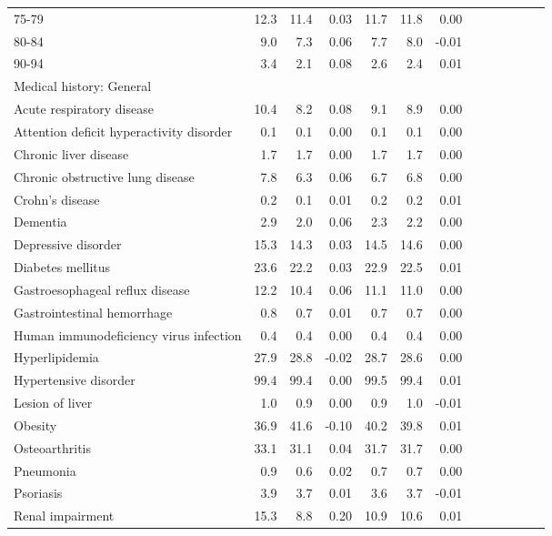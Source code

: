 \documentclass[11pt,]{article}
\begin{document}
\begin{longtable}{lrrrrrrrrrrrr}
      75-79 & 12.3 & 11.4 &  0.03 &  11.7 & 11.8 &  0.00 \\ 
      80-84 &  9.0 &  7.3 &  0.06 &   7.7 &  8.0 & -0.01 \\ 
      90-94 &  3.4 &  2.1 &  0.08 &   2.6 &  2.4 &  0.01 \\ 
  Medical history: General &    &    &     &     &    &     \\ 
      Acute respiratory disease & 10.4 &  8.2 &  0.08 &   9.1 &  8.9 &  0.00 \\ 
      Attention deficit hyperactivity disorder &  0.1 &  0.1 &  0.00 &   0.1 &  0.1 &  0.00 \\ 
      Chronic liver disease &  1.7 &  1.7 &  0.00 &   1.7 &  1.7 &  0.00 \\ 
      Chronic obstructive lung disease &  7.8 &  6.3 &  0.06 &   6.7 &  6.8 &  0.00 \\ 
      Crohn's disease &  0.2 &  0.1 &  0.01 &   0.2 &  0.2 &  0.01 \\ 
      Dementia &  2.9 &  2.0 &  0.06 &   2.3 &  2.2 &  0.00 \\ 
      Depressive disorder & 15.3 & 14.3 &  0.03 &  14.5 & 14.6 &  0.00 \\ 
      Diabetes mellitus & 23.6 & 22.2 &  0.03 &  22.9 & 22.5 &  0.01 \\ 
      Gastroesophageal reflux disease & 12.2 & 10.4 &  0.06 &  11.1 & 11.0 &  0.00 \\ 
      Gastrointestinal hemorrhage &  0.8 &  0.7 &  0.01 &   0.7 &  0.7 &  0.00 \\ 
      Human immunodeficiency virus infection &  0.4 &  0.4 &  0.00 &   0.4 &  0.4 &  0.00 \\ 
      Hyperlipidemia & 27.9 & 28.8 & -0.02 &  28.7 & 28.6 &  0.00 \\ 
      Hypertensive disorder & 99.4 & 99.4 &  0.00 &  99.5 & 99.4 &  0.01 \\ 
      Lesion of liver &  1.0 &  0.9 &  0.00 &   0.9 &  1.0 & -0.01 \\ 
      Obesity & 36.9 & 41.6 & -0.10 &  40.2 & 39.8 &  0.01 \\ 
      Osteoarthritis & 33.1 & 31.1 &  0.04 &  31.7 & 31.7 &  0.00 \\ 
      Pneumonia &  0.9 &  0.6 &  0.02 &   0.7 &  0.7 &  0.00 \\ 
      Psoriasis &  3.9 &  3.7 &  0.01 &   3.6 &  3.7 & -0.01 \\ 
      Renal impairment & 15.3 &  8.8 &  0.20 &  10.9 & 10.6 &  0.01 \\ 

\end{longtable}
\end{document}

